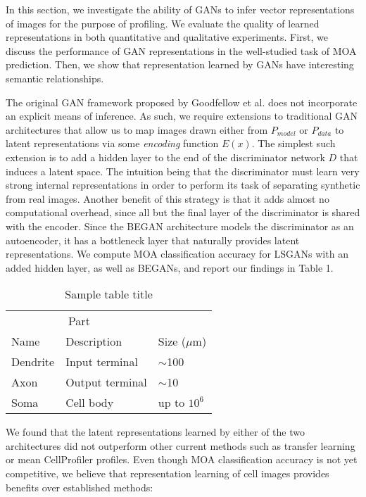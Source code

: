 \documentclass{article}
\begin{document}
In this section, we investigate the ability of GANs to infer vector representations of images for the purpose of profiling. We evaluate the quality of learned representations in both quantitative and qualitative experiments. First, we discuss the performance of GAN representations in the well-studied task of MOA prediction. Then, we show that representation learned by GANs have interesting semantic relationships.

The original GAN framework proposed by Goodfellow et al. does not incorporate an explicit means of inference. As such, we require extensions to traditional GAN architectures that allow us to map images drawn either from $P_{model}$ or $P_{data}$ to latent representations via some \emph{encoding} function $E(x)$. The simplest such extension is to add a hidden layer to the end of the discriminator network $D$ that induces a latent space. The intuition being that the discriminator must learn very strong internal representations in order to perform its task of separating synthetic from real images. Another benefit of this strategy is that it adds almost no computational overhead, since all but the final layer of the discriminator is shared with the encoder.  Since the BEGAN architecture models the discriminator as an autoencoder, it has a bottleneck layer that naturally provides latent representations. We compute MOA classification accuracy for LSGANs with an added hidden layer, as well as BEGANs, and report our findings in Table 1.

\begin{table}[t]
  \caption{Sample table title}
  \label{sample-table}
  \centering
  \begin{tabular}{lll}
    \toprule
    \multicolumn{2}{c}{Part}                   \\
    \cmidrule{1-2}
    Name     & Description     & Size ($\mu$m) \\
    \midrule
    Dendrite & Input terminal  & $\sim$100     \\
    Axon     & Output terminal & $\sim$10      \\
    Soma     & Cell body       & up to $10^6$  \\
    \bottomrule
  \end{tabular}
\end{table}


We found that the latent representations learned by either of the two architectures did not outperform other current methods such as transfer learning or mean CellProfiler profiles. Even though MOA classification accuracy is not yet competitive, we believe that representation learning of cell images provides benefits over established methods:
\end{document}
